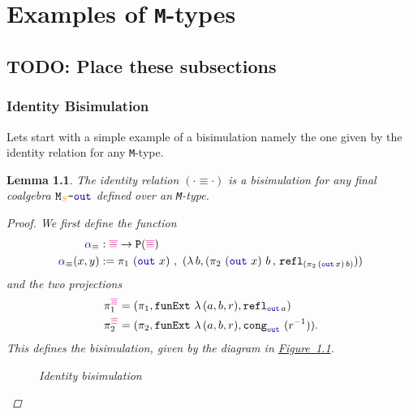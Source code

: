 \documentclass[twoside,11pt,openright]{report}
\theoremstyle{plain} %
\newtheorem{lem}[thm]{Lemma}
\theoremstyle{definition}
\theoremstyle{remark}
\newcommand*{\figref}[1]{\hyperref[fig:#1]{Figure~\ref*{fig:#1}}}
\newcommand*{\type}[1]{\textcolor{magenta!90!black}{#1}}
\newcommand*{\container}[1]{\textcolor{orange}{#1}}
\newcommand*{\coalg}[2]{#1\texttt{-}#2}
\newcommand*{\function}[1]{\textcolor{blue!60!black}{\ensuremath{\mathtt{#1}}}}
\newcommand*{\typeformer}[1]{\ensuremath{\mathtt{#1}}}
\newcommand*{\functor}[1]{\ensuremath{\mathbf{\mathtt{#1}}}}
\newcommand*{\sym}[1]{\ensuremath{#1^{-1}}}
\begin{document}

\chapter{Examples of \texttt{M}-types}
\section{TODO: Place these subsections}
\subsection{Identity Bisimulation}
Lets start with a simple example of a bisimulation namely the one given by the identity relation for any \texttt{M}-type.
\begin{lem}
  The identity relation \((\cdot \equiv \cdot)\) is a bisimulation for any final coalgebra \(\coalg{\typeformer{M}_{\container{S}}}{\function{out}}\) defined over an \texttt{M}-type.
  
  \begin{proof}
  We first define the function
  \begin{equation}
    \begin{aligned}
      \function{\alpha}_{\equiv} &: \type{\overline{\equiv}} \rightarrow \functor{P}(\type{\overline{\equiv}}) \\
      \function{\alpha}_{\equiv} (x , y) &:= \pi_1~(\function{out}~x)~,~(\lambda\,b, (\pi_2~(\function{out}~x)~b \,,\, \texttt{refl}_{(\pi_2\,(\function{out}\,x)\,b)}))
    \end{aligned}
  \end{equation}
  and the two projections
  \begin{align}
    \pi_1^{\type{\overline{\equiv}}} &= (\pi_1 , \texttt{funExt}~\lambda\,(a,b,r), \texttt{refl}_{\function{out}\,a}) \\
    \pi_2^{\type{\overline{\equiv}}} &= (\pi_2 , \texttt{funExt}~\lambda\,(a,b,r), \texttt{cong}_{\function{out}}~(\sym{r})).
  \end{align}
  This defines the bisimulation, given by the diagram in \figref{id-bisim}.
  \begin{figure}[h]
    \centering
    \caption{Identity bisimulation}
    \label{fig:id-bisim}
  \end{figure}
\end{proof}
\end{lem}
\end{document}
